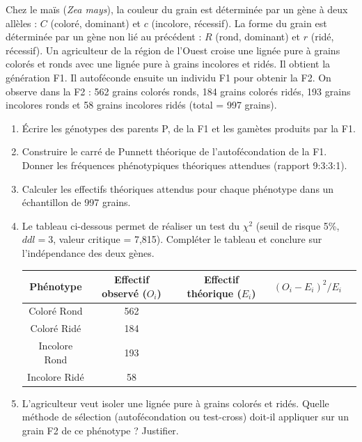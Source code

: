 \documentclass[11pt]{article}
\begin{document}
\begin{exercice}
Chez le maïs (\textit{Zea mays}), la couleur du grain est déterminée par un gène à deux allèles : $C$ (coloré, dominant) et $c$ (incolore, récessif). La forme du grain est déterminée par un gène non lié au précédent : $R$ (rond, dominant) et $r$ (ridé, récessif). Un agriculteur de la région de l'Ouest croise une lignée pure à grains colorés et ronds avec une lignée pure à grains incolores et ridés. Il obtient la génération F1. Il autoféconde ensuite un individu F1 pour obtenir la F2. On observe dans la F2 : 562 grains colorés ronds, 184 grains colorés ridés, 193 grains incolores ronds et 58 grains incolores ridés (total = 997 grains).

\begin{enumerate}
\item Écrire les génotypes des parents P, de la F1 et les gamètes produits par la F1.
\item Construire le carré de Punnett théorique de l'autofécondation de la F1. Donner les fréquences phénotypiques théoriques attendues (rapport 9:3:3:1).
\item Calculer les effectifs théoriques attendus pour chaque phénotype dans un échantillon de 997 grains.
\item Le tableau ci-dessous permet de réaliser un test du $\chi^2$ (seuil de risque 5\%, $ddl=3$, valeur critique = 7,815). Compléter le tableau et conclure sur l'indépendance des deux gènes.
\begin{center}
\begin{tabular}{|c|c|c|c|c|}
\hline
Phénotype & Effectif observé ($O_i$) & Effectif théorique ($E_i$) & $(O_i-E_i)^2/E_i$ \\ \hline
Coloré Rond & 562 & & \\ \hline
Coloré Ridé & 184 & & \\ \hline
Incolore Rond & 193 & & \\ \hline
Incolore Ridé & 58 & & \\ \hline
\end{tabular}
\end{center}
\item L'agriculteur veut isoler une lignée pure à grains colorés et ridés. Quelle méthode de sélection (autofécondation ou test-cross) doit-il appliquer sur un grain F2 de ce phénotype ? Justifier.
\end{enumerate}
\end{exercice}
\end{document}
